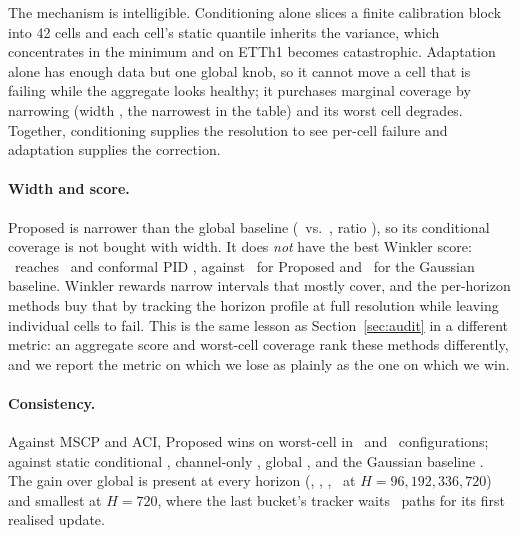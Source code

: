 \documentclass[11pt]{article}
\begin{document}
The mechanism is intelligible. Conditioning alone slices a finite calibration block into 42 cells and each cell's static quantile inherits the variance, which concentrates in the minimum and on ETTh1 becomes catastrophic. Adaptation alone has enough data but one global knob, so it cannot move a cell that is failing while the aggregate looks healthy; it purchases marginal coverage by narrowing (width \ettACIdWidth, the narrowest in the table) and its worst cell degrades. Together, conditioning supplies the resolution to see per-cell failure and adaptation supplies the correction.

\paragraph{Width and score.} Proposed is narrower than the global baseline (\ettPropDWidth\ vs.\ \ettGlobalWidth, ratio \ettPropDWidthOverGlobal), so its conditional coverage is not bought with width. It does \emph{not} have the best Winkler score: \obettBestWinklerMethod\ reaches \obettMSCPonWink\ and conformal PID \obettPIDWink, against \ettPropDWink\ for Proposed and \ettGaussWink\ for the Gaussian baseline. Winkler rewards narrow intervals that mostly cover, and the per-horizon methods buy that by tracking the horizon profile at full resolution while leaving individual cells to fail. This is the same lesson as Section~\ref{sec:audit} in a different metric: an aggregate score and worst-cell coverage rank these methods differently, and we report the metric on which we lose as plainly as the one on which we win.

\paragraph{Consistency.} Against MSCP and ACI, Proposed wins on worst-cell in \ettPropWinsMSCPD\ and \ettPropWinsACIdD\ configurations; against static conditional \ettPropWinsCondD, channel-only \ettPropWinsCondCD, global \ettPropDWinsG, and the Gaussian baseline \ettPropWinsGaussD. The gain over global is present at every horizon (\ettPropGainNinetySixD, \ettPropGainOneNinetyTwoD, \ettPropGainThreeThirtySixD, \ettPropGainSevenTwentyD\ at $H = 96, 192, 336, 720$) and smallest at $H = 720$, where the last bucket's tracker waits \ettLagLastBucketSevenTwenty\ paths for its first realised update.
\end{document}
